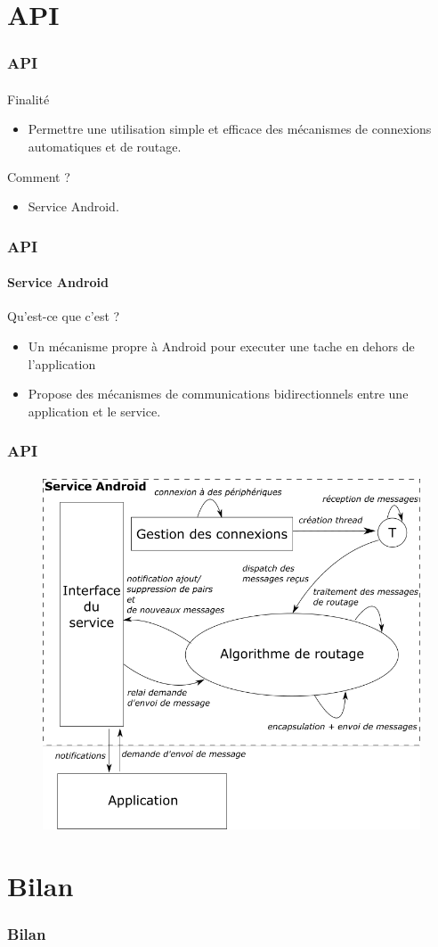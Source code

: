 \documentclass{beamer}
\begin{document}
  \section{API}
  \begin{frame}
    \frametitle{API}
    \framesubtitle{}
  	\begin{block}{Finalité}
        \begin{itemize}
        	\item Permettre une utilisation simple et efficace des mécanismes de connexions automatiques et de routage.
        \end{itemize}
    \end{block}
    \begin{block}{Comment ?}
    \begin{itemize}
    	\item Service Android.
    \end{itemize}
    \end{block}
  \end{frame}
    \begin{frame}
    \frametitle{API}
    \framesubtitle{Service Android}
  	\begin{block}{Qu'est-ce que c'est ?}
        \begin{itemize}
        	\item Un mécanisme propre à Android pour executer une tache en dehors de l'application
        	\item Propose des mécanismes de communications bidirectionnels entre une application et le service.
        \end{itemize}
    \end{block}
  \end{frame}
  \begin{frame}
    \frametitle{API}
    \framesubtitle{}
        \begin{figure}
          \begin{center}
            \includegraphics[width=.6\textwidth]{images/api.png}
            \label{fig:auto}
          \end{center}
        \end{figure}
  \end{frame}
  
  
  \section{Bilan}
  \begin{frame}
    \frametitle{Bilan}
    \framesubtitle{}
  
  \end{frame}
  
\end{document}
